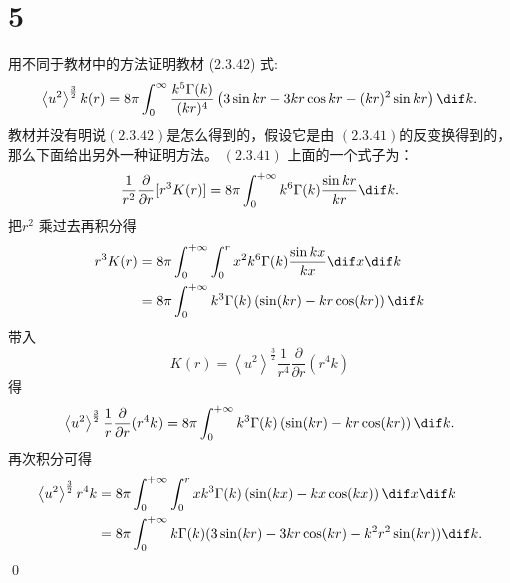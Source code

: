 \documentclass[12pt,a4]{ctexart}
\begin{document}
\section{5}

用不同于教材中的方法证明教材 (2.3.42) 式:
\begin{equation}
   \left\langle u^{2}\right\rangle^{\frac{3}{2}} k(r)=8 \pi \int_{0}^{\infty} \frac{k^{5} \Gamma(k)}{(k r)^{4}}\left(3 \sin k r-3 k r \cos k r-(k r)^{2} \sin k r\right)\dif k.
\end{equation}
教材并没有明说$(2.3.42)$是怎么得到的，假设它是由 $(2.3.41)$的反变换得到的，那么下面给出另外一种证明方法。 $(2.3.41)$ 上面的一个式子为：
\begin{equation}
   \frac{1}{r^2} \frac{\partial }{\partial r} [r^3 K(r)] = 8 \pi \int_{0}^{+\infty} k^6 \Gamma(k) \frac{\sin kr}{kr} \dif k.
\end{equation}
把$r^2$ 乘过去再积分得
\begin{equation}
   \begin{aligned}
      r^3 K(r) & =  8 \pi \int_{0}^{+\infty} \int_{0}^r x^2 k^6 \Gamma(k) \frac{\sin kx}{kx} \dif x \dif k \\
               & = 8 \pi \int_{0}^{+\infty} k^3 \Gamma(k) \left( \sin(kr) - k r \cos(kr) \right) \dif k    \\
   \end{aligned}
\end{equation}
带入
\begin{equation}
   K(r) = \left\langle u^{2}\right\rangle^{\frac{3}{2}} \frac{1}{r^4} \frac{\partial }{\partial r} (r^4k)
\end{equation}
得
\begin{equation}
   \left\langle u^{2}\right\rangle^{\frac{3}{2}} \frac{1}{r} \frac{\partial }{\partial r} (r^4k)  = 8 \pi \int_{0}^{+\infty} k^3 \Gamma(k) \left( \sin(kr) - k r \cos(kr) \right) \dif k.
\end{equation}
再次积分可得
\begin{equation}
   \begin{aligned}
      \left\langle u^{2}\right\rangle^{\frac{3}{2}} r^4k & = 8 \pi \int_{0}^{+\infty} \int_{0}^r x k^3 \Gamma(k) \left( \sin(kx) - k x \cos(kx) \right) \dif x \dif k \\
                                                         & = 8 \pi \int_{0}^{+\infty}   k \Gamma(k) ( 3 \sin(kr) - 3 k r \cos(k r) - k^2 r^2 \sin(kr) )  \dif k.      \\
   \end{aligned}
\end{equation}
\qed
\end{document}

